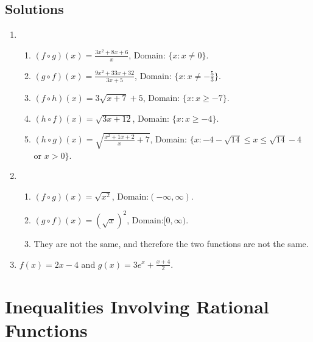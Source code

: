 \documentclass[11pt]{book}               %
\begin{document}
\subsection{Solutions} 
\begin{enumerate}
\item
\begin{enumerate}
\item $(f\circ g)(x)=\frac{3x^2+8x+6}{x}$, Domain: $\{x:x\neq 0\}$.
\item $(g\circ f)(x)=\frac{9x^2+33x+32}{3x+5}$, Domain: $\{x:x\neq -\frac{5}{3}\}$.
\item $(f\circ h)(x)=3\sqrt{x+7}+5$, Domain: $\{x:x\geq-7\}$.
\item $(h\circ f)(x)=\sqrt{3x+12}$, Domain: $\{x:x\geq-4\}$.
\item $(h\circ g)(x)=\sqrt{\frac{x^2+1x+2}{x}+7}$, Domain: $\{x:-4-\sqrt{14}\leq x\leq\sqrt{14}-4$ or $x>0\}$.
\end{enumerate}
\item 
\begin{enumerate}
\item $(f\circ g)(x)=\sqrt{x^2}$, Domain:$(-\infty,\infty)$.
\item $(g\circ f)(x)=(\sqrt{x})^2$, Domain:$[0,\infty)$.
\item They are not the same, and therefore the two functions are not the same.
\end{enumerate}

\item $f(x) = 2x-4$ and $g(x) = 3e^x + \frac{x+4}{2}$.
\end{enumerate}

\newpage
\label{section_rational-function-inequalities}
\section{Inequalities Involving Rational Functions}

%
%
%
\end{document}
